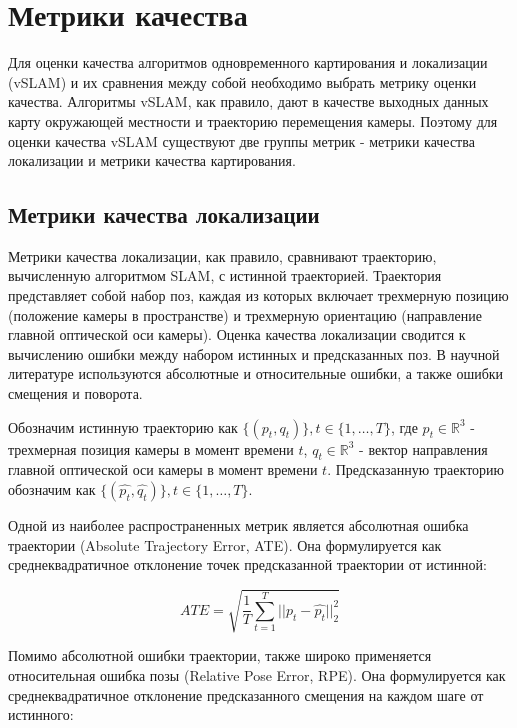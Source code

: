 \documentclass{mipt-thesis-ms}
\begin{document}
	\section{Метрики качества}
	
	Для оценки качества алгоритмов одновременного картирования и локализации (vSLAM) и их сравнения между собой необходимо выбрать метрику оценки качества. Алгоритмы vSLAM, как правило, дают в качестве выходных данных карту окружающей местности и траекторию перемещения камеры. Поэтому для оценки качества vSLAM существуют две группы метрик - метрики качества локализации и метрики качества картирования.
	
	\subsection{Метрики качества локализации}
	
	Метрики качества локализации, как правило, сравнивают траекторию, вычисленную алгоритмом SLAM, с истинной траекторией. Траектория представляет собой набор поз, каждая из которых включает трехмерную позицию (положение камеры в пространстве) и трехмерную ориентацию (направление главной оптической оси камеры). Оценка качества локализации сводится к вычислению ошибки между набором истинных и предсказанных поз. В научной литературе используются абсолютные и относительные ошибки, а также ошибки смещения и поворота.
	
	Обозначим истинную траекторию как $\{(p_t, q_t)\}, t \in \{1, \dots, T\}$, где $p_t \in \mathbb{R}^3$ - трехмерная позиция камеры в момент времени $t$, $q_t \in \mathbb{R}^3$ - вектор направления главной оптической оси камеры в момент времени $t$. Предсказанную траекторию обозначим как $\{(\widehat{p_t}, \widehat{q_t})\}, t \in \{1, \dots, T\}$.
	
	Одной из наиболее распространенных метрик является абсолютная ошибка траектории (Absolute Trajectory Error, ATE). Она формулируется как среднеквадратичное отклонение точек предсказанной траектории от истинной:
	
	\begin{equation}
	\label{eq_ate}
	ATE = \sqrt{\frac{1}{T} \sum_{t=1}^T || p_t - \widehat{p_t} ||_2^2}
	\end{equation}
	
	Помимо абсолютной ошибки траектории, также широко применяется относительная ошибка позы (Relative Pose Error, RPE). Она формулируется как среднеквадратичное отклонение предсказанного смещения на каждом шаге от истинного:
	
\end{document}
